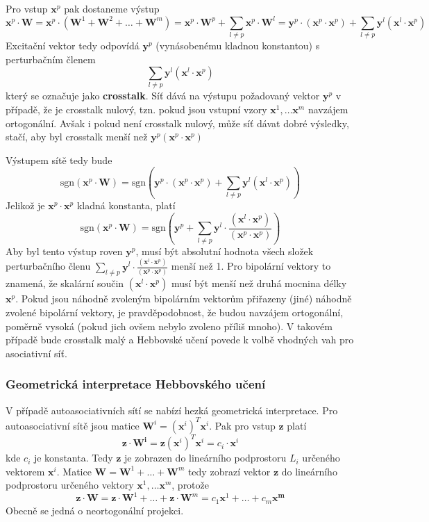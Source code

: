 \documentclass[11pt]{report} %
\renewcommand{\vec}[1]{\mathbf{#1}}
\numberwithin{equation}{section}
\begin{document}
Pro vstup $\vec{x}^p$ pak dostaneme výstup
$$\vec{x}^p \cdot \vec{W} = \vec{x}^p \cdot (\vec{W}^1 + \vec{W}^2 + \dots + \vec{W}^m) = \vec{x}^p \cdot \vec{W}^p  + \sum\limits_{l\neq p}\vec{x}^p \cdot \vec{W}^l = \vec{y}^p \cdot (\vec{x}^p\cdot\vec{x}^p) + \sum\limits_{l\neq p}\vec{y}^l (\vec{x}^l \cdot \vec{x}^p)$$
Excitační vektor tedy odpovídá $\vec{y}^p$ (vynásobenému kladnou konstantou) s perturbačním členem
$$\sum\limits_{l\neq p}\vec{y}^l (\vec{x}^l \cdot \vec{x}^p)$$
který se označuje jako \textbf{crosstalk}. Síť dává na výstupu požadovaný vektor $\vec{y}^p$ v případě, že
je crosstalk nulový, tzn. pokud jsou vstupní vzory $\vec{x}^1, \dots \vec{x}^m$ navzájem ortogonální. Avšak i pokud není crosstalk nulový, může síť dávat dobré výsledky, stačí, aby byl crosstalk menší než $\vec{y}^p (\vec{x}^p \cdot \vec{x}^p)$

Výstupem sítě tedy bude
$$\text{sgn}(\vec{x}^p\cdot \vec{W}) = \text{sgn}\left(\vec{y}^p \cdot (\vec{x}^p\cdot\vec{x}^p) + \sum\limits_{l\neq p}\vec{y}^l (\vec{x}^l \cdot \vec{x}^p)\right)$$
Jelikož je $\vec{x}^p \cdot \vec{x}^p$ kladná konstanta, platí
$$\text{sgn}(\vec{x}^p\cdot \vec{W}) = \text{sgn}\left(\vec{y}^p  + \sum\limits_{l\neq p}\vec{y}^l \cdot \frac{(\vec{x}^l \cdot \vec{x}^p)}{(\vec{x}^p\cdot\vec{x}^p)}\right)$$
Aby byl tento výstup roven $\vec{y}^p$, musí být absolutní hodnota všech složek perturbačního členu $\sum\limits_{l\neq p}\vec{y}^l \cdot \frac{(\vec{x}^l \cdot \vec{x}^p)}{(\vec{x}^p\cdot\vec{x}^p)}$ menší než 1. Pro bipolární vektory to znamená, že skalární součin $(\vec{x}^l\cdot\vec{x}^p)$ musí být menší než druhá mocnina délky $\vec{x}^p$. Pokud jsou náhodně zvoleným bipolárním vektorům přiřazeny (jiné) náhodně zvolené bipolární vektory, je pravděpodobnost, že budou navzájem ortogonální, poměrně vysoká (pokud jich ovšem nebylo zvoleno příliš mnoho). V takovém případě bude crosstalk malý a Hebbovské učení povede k volbě vhodných vah pro asociativní síť.

\subsubsection{Geometrická interpretace Hebbovského učení}
V případě autoasociativních sítí se nabízí hezká geometrická interpretace. Pro autoasociativní sítě jsou matice $\vec{W}^i = (\vec{x}^i)^T \vec{x}^i$. Pak pro vstup $\vec{z}$ platí 
$$\vec{z}\cdot \vec{W^i} = \vec{z} (\vec{x}^i)^T \vec{x}^i = c_i \cdot \vec{x}^i$$
kde $c_i$ je konstanta. Tedy $\vec{z}$ je zobrazen do lineárního podprostoru $L_i$ určeného vektorem $\vec{x}^i$. Matice $\vec{W} = \vec{W}^1 + \dots + \vec{W}^m$ tedy zobrazí vektor $\vec{z}$ do lineárního podprostoru určeného vektory $\vec{x}^1, \dots \vec{x}^m$, protože 
$$\vec{z}\cdot \vec{W} = \vec{z}\cdot \vec{W}^1 + \dots +\vec{z}\cdot \vec{W}^m = c_1\vec{x}^1 + \dots + c_m\vec{x^m}$$
Obecně se jedná o neortogonální projekci.
\end{document}
